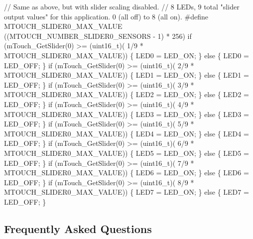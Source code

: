 \begin{DoxyCode}
\textcolor{comment}{// Same as above, but with slider scaling disabled.}
\textcolor{comment}{// 8 LEDs, 9 total "slider output values" for this application. 0 (all off) to 8 (all on).}
\textcolor{preprocessor}{#define MTOUCH\_SLIDER0\_MAX\_VALUE     ((MTOUCH\_NUMBER\_SLIDER0\_SENSORS - 1) * 256)}
\textcolor{keywordflow}{if} (mTouch\_GetSlider(0) >= (uint16\_t)( 1/9 * MTOUCH\_SLIDER0\_MAX\_VALUE)) \{ LED0 = LED\_ON; \} \textcolor{keywordflow}{else} \{ LED0 = 
      LED\_OFF; \}
\textcolor{keywordflow}{if} (mTouch\_GetSlider(0) >= (uint16\_t)( 2/9 * MTOUCH\_SLIDER0\_MAX\_VALUE)) \{ LED1 = LED\_ON; \} \textcolor{keywordflow}{else} \{ LED1 = 
      LED\_OFF; \}
\textcolor{keywordflow}{if} (mTouch\_GetSlider(0) >= (uint16\_t)( 3/9 * MTOUCH\_SLIDER0\_MAX\_VALUE)) \{ LED2 = LED\_ON; \} \textcolor{keywordflow}{else} \{ LED2 = 
      LED\_OFF; \}
\textcolor{keywordflow}{if} (mTouch\_GetSlider(0) >= (uint16\_t)( 4/9 * MTOUCH\_SLIDER0\_MAX\_VALUE)) \{ LED3 = LED\_ON; \} \textcolor{keywordflow}{else} \{ LED3 = 
      LED\_OFF; \}
\textcolor{keywordflow}{if} (mTouch\_GetSlider(0) >= (uint16\_t)( 5/9 * MTOUCH\_SLIDER0\_MAX\_VALUE)) \{ LED4 = LED\_ON; \} \textcolor{keywordflow}{else} \{ LED4 = 
      LED\_OFF; \}
\textcolor{keywordflow}{if} (mTouch\_GetSlider(0) >= (uint16\_t)( 6/9 * MTOUCH\_SLIDER0\_MAX\_VALUE)) \{ LED5 = LED\_ON; \} \textcolor{keywordflow}{else} \{ LED5 = 
      LED\_OFF; \}
\textcolor{keywordflow}{if} (mTouch\_GetSlider(0) >= (uint16\_t)( 7/9 * MTOUCH\_SLIDER0\_MAX\_VALUE)) \{ LED6 = LED\_ON; \} \textcolor{keywordflow}{else} \{ LED6 = 
      LED\_OFF; \}
\textcolor{keywordflow}{if} (mTouch\_GetSlider(0) >= (uint16\_t)( 8/9 * MTOUCH\_SLIDER0\_MAX\_VALUE)) \{ LED7 = LED\_ON; \} \textcolor{keywordflow}{else} \{ LED7 = 
      LED\_OFF; \}
\end{DoxyCode}
\hypertarget{feat_sliders_featSlider-FAQ}{}\subsection{Frequently Asked Questions}\label{feat_sliders_featSlider-FAQ}

